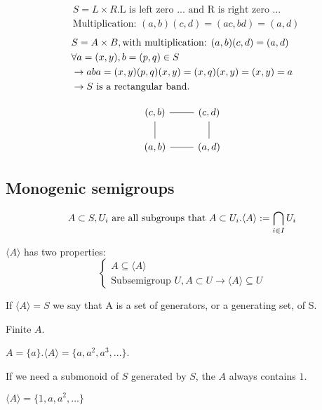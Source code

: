 \begin{Them}
\begin{Prof}
        \begin{align*}
            &S=L\times R.\text{L is left zero ... and R is right zero ...}  \\
            &\text{Multiplication: } (a,b)(c,d)=(ac,bd)=(a,d)
        \end{align*}
        \begin{align*}
            &S=A\times B, \text{with multiplication: }(a,b)(c,d)=(a,d)\\
            &\forall a=(x,y),b=(p,q)\in S   \\
            &\rightarrow aba=(x,y)(p,q)(x,y)=(x,q)(x,y)=(x,y)=a \\
            &\rightarrow S\text{\space is a rectangular band.}
        \end{align*}
    \end{Prof}
    \[\begin{tikzcd}
        (c,b)
            \arrow[r, dash]
            \arrow[d, dash] &
        (c,d)
            \arrow[d, dash] \\
        (a,b)
            \arrow[r, dash] &
        (a,d)
    \end{tikzcd}\]

\end{Them}

\subsection[2]{Monogenic semigroups}

\begin{Sym}
    \[
        A \subset S, U_i \text{\space are all subgroups that }A \subset U_i.\langle A \rangle:=\bigcap_{i \in I}U_i
    \]
    
    $\langle A \rangle$ has two properties:
    \[\begin{cases}
        A \subseteq \langle A\rangle    \\
        \text{Subsemigroup } U, A\subset U \rightarrow \langle A\rangle \subseteq U
    \end{cases}\]

    If $\langle A\rangle = S$ we say that A is a set of generators, or a generating set, of S.
\end{Sym}

\begin{Exap}
    Finite $A$.

    $A=\{a\}. \langle A\rangle=\{a,a^2,a^3,...\}$.

    If we need a submonoid of $S$ generated by $S$, the $A$ always contains $1$.

    $\langle A \rangle=\{1,a,a^2,...\}$
\end{Exap}

